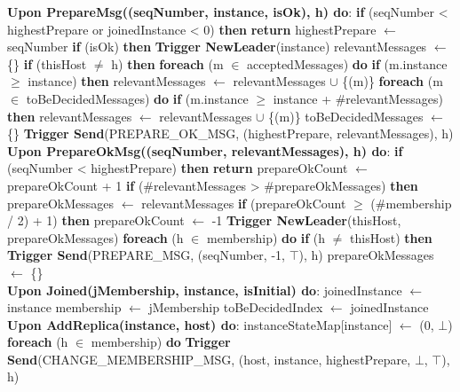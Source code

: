 \documentclass[sigconf]{acmart}
\begin{document}
\begin{algorithmic}[1]
\State \textbf{Upon PrepareMsg((seqNumber, instance, isOk), h) do}:
\State \quad \textbf{if} (seqNumber < highestPrepare or joinedInstance < 0) \textbf{then}
\State \quad \quad \textbf{return}
\State \quad highestPrepare $\gets$ seqNumber
\State \quad \textbf{if} (isOk) \textbf{then}
\State \quad \quad \textbf{Trigger NewLeader}(instance)
\State \quad relevantMessages $\gets$ \{\}
\State \quad \textbf{if} (thisHost $\neq$ h) \textbf{then}
\State \quad \quad \textbf{foreach} (m $\in$ acceptedMessages) \textbf{do}
\State \quad \quad \quad \textbf{if} (m.instance $\ge$ instance) \textbf{then}
\State \quad \quad \quad \quad relevantMessages $\gets$ relevantMessages $\cup$ \{(m)\}
\State \quad \quad \textbf{foreach} (m $\in$ toBeDecidedMessages) \textbf{do}
\State \quad \quad \quad \textbf{if} (m.instance $\ge$ instance + \#relevantMessages) \textbf{then}
\State \quad \quad \quad \quad relevantMessages $\gets$ relevantMessages $\cup$ \{(m)\}
\State \quad \quad toBeDecidedMessages $\gets$ \{\}
\State \quad \textbf{Trigger Send}(PREPARE\_OK\_MSG, (highestPrepare, relevantMessages), h) \\

\State \textbf{Upon PrepareOkMsg((seqNumber, relevantMessages), h) do}:
\State \quad \textbf{if} (seqNumber < highestPrepare) \textbf{then}
\State \quad \quad \textbf{return}
\State \quad prepareOkCount $\gets$ prepareOkCount + 1
\State \quad \textbf{if} (\#relevantMessages > \#prepareOkMessages) \textbf{then}
\State \quad \quad prepareOkMessages $\gets$ relevantMessages
\State \quad \textbf{if} (prepareOkCount $\ge$ (\#membership / 2) + 1) \textbf{then}
\State \quad \quad prepareOkCount $\gets$ -1
\State \quad \quad \textbf{Trigger NewLeader}(thisHost, prepareOkMessages)
\State \quad \quad \textbf{foreach} (h $\in$ membership) \textbf{do}
\State \quad \quad \quad \textbf{if} (h $\neq$ thisHost) \textbf{then}
\State \quad \quad \quad \quad \textbf{Trigger Send}(PREPARE\_MSG, (seqNumber, -1, $\top$), h)
\State \quad \quad prepareOkMessages $\gets$ \{\} \\

\State \textbf{Upon Joined(jMembership, instance, isInitial) do}:
\State \quad joinedInstance $\gets$ instance
\State \quad membership $\gets$ jMembership
\State \quad toBeDecidedIndex $\gets$ joinedInstance \\

\State \textbf{Upon AddReplica(instance, host) do}:
\State \quad instanceStateMap[instance] $\gets$ (0, $\bot$)
\State \quad \textbf{foreach} (h $\in$ membership) \textbf{do}
\State \quad \quad \textbf{Trigger Send}(CHANGE\_MEMBERSHIP\_MSG, (host, instance, highestPrepare, $\bot$, $\top$), h) \\


\end{algorithmic}
\end{document}
